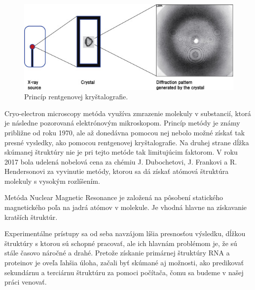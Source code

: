 \begin{figure}%
\includegraphics[width=\textwidth]{../img/x-ray}
\caption{Princíp rentgenovej kryštalografie. \cite{Ryu17}}
\label{obr03:x-ray}
\end{figure}


\indent Cryo-electron microscopy metóda využíva zmrazenie molekuly v substancií, ktorá je následne pozorovaná elektrónovým mikroskopom. Princíp metódy je známy približne od roku 1970, ale až donedávna pomocou nej nebolo možné získať tak presné vysledky, ako pomocou rentgenovej kryštalografie. Na druhej strane dĺžka skúmanej štruktúry nie je pri tejto metóde tak limitujúcim faktorom. V roku 2017 bola udelená nobelová cena za chémiu  J. Dubochetovi, J. Frankovi a  R. Hendersonovi za vyvinutie metódy, ktorou sa dá získať atómová štruktúra molekuly s vysokým rozlíšením.


\indent Metóda Nuclear Magnetic Resonance je založená na pôsobení statického magnetického poľa na jadrá atómov v molekule. Je vhodná hlavne na získavanie kratších štruktúr.


\indent Experimentálne prístupy sa od seba navzájom líšia presnosťou výsledku, dĺžkou štruktúry s ktorou sú schopné pracovať, ale ich hlavnám problémom je, že sú stále časovo náročné a drahé. Pretože získanie primárnej štruktúry RNA a proteinov je oveľa ľahšia úloha, začali byť skúmané aj možnosti, ako predikovať sekundárnu a terciárnu štruktúru za pomoci počítača, čomu sa budeme v našej práci venovať.